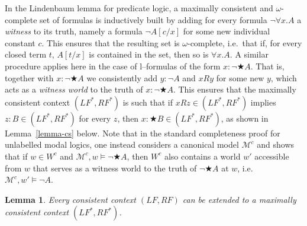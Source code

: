\documentclass[times, 10pt]{article}
\newtheorem{lemma}{Lemma}
\newcommand{\LF}{\mathit{LF}}
\newcommand{\RF}{\mathit{RF}}
\begin{document}
In the Lindenbaum lemma for predicate logic, a maximally consistent and $\omega$-complete 
set of formulas is inductively built by adding for every formula $\neg \forall x. A$ a 
\emph{witness} to its truth, namely a formula $\neg A[c/x]$ for some new individual constant 
$c$. This ensures that the resulting set is $\omega$-complete, i.e.~that if, for every closed 
term $t$, $A[t/x]$ is contained in the set, then so is $\forall x. A$. A similar procedure applies 
here in the case of l--formulas of the form $x: \neg \bigstar A$.  That is, together with $x: \neg
\bigstar A$ we consistently add $y: \neg A$ and $x R y$ for some new $y$, which acts as a 
\emph{witness world} to the truth of $x: \neg \bigstar A$.  This ensures that the maximally
consistent context $(\LF^*,\RF^*)$ is such that if $x R z \in (\LF^*,\RF^*)$ implies 
$z:B \in (\LF^*,\RF^*)$ for every $z$, then $x: \bigstar B \in (\LF^*,\RF^*)$, as shown in
Lemma~\ref{lemma-cs} below.  Note that in the standard completeness proof for unlabelled 
modal logics, one instead considers a canonical model $\mathscr{M}^c$ and shows that
if $w \in W^c$ and $\mathscr{M}^c,w \vDash \neg \bigstar A$, then $W^c$ also
contains a world $w'$ accessible from $w$ that serves as a witness
world to the truth of $\neg \bigstar A$ at $w$, i.e.~$\mathscr{M}^c,w' \vDash \neg A$.
\begin{lemma}\label{lemma-lindenbaum}
  Every consistent context $(\LF,\RF)$ can be extended to
  a maximally consistent context $(\LF^*,\RF^*)$.
\end{lemma}
\end{document}

